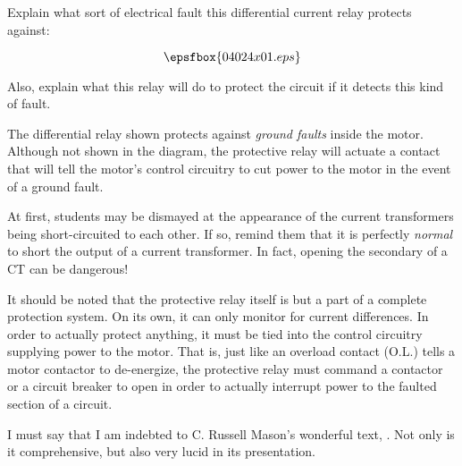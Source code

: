 

Explain what sort of electrical fault this differential current relay protects against:

$$\epsfbox{04024x01.eps}$$

Also, explain what this relay will do to protect the circuit if it detects this kind of fault.







The differential relay shown protects against {\it ground faults} inside the motor.  Although not shown in the diagram, the protective relay will actuate a contact that will tell the motor's control circuitry to cut power to the motor in the event of a ground fault.







At first, students may be dismayed at the appearance of the current transformers being short-circuited to each other.  If so, remind them that it is perfectly {\it normal} to short the output of a current transformer.  In fact, opening the secondary of a CT can be dangerous!

It should be noted that the protective relay itself is but a part of a complete protection system.  On its own, it can only monitor for current differences.  In order to actually protect anything, it must be tied into the control circuitry supplying power to the motor.  That is, just like an overload contact (O.L.) tells a motor contactor to de-energize, the protective relay must command a contactor or a circuit breaker to open in order to actually interrupt power to the faulted section of a circuit.

I must say that I am indebted to C. Russell Mason's wonderful text, .  Not only is it comprehensive, but also very lucid in its presentation.




